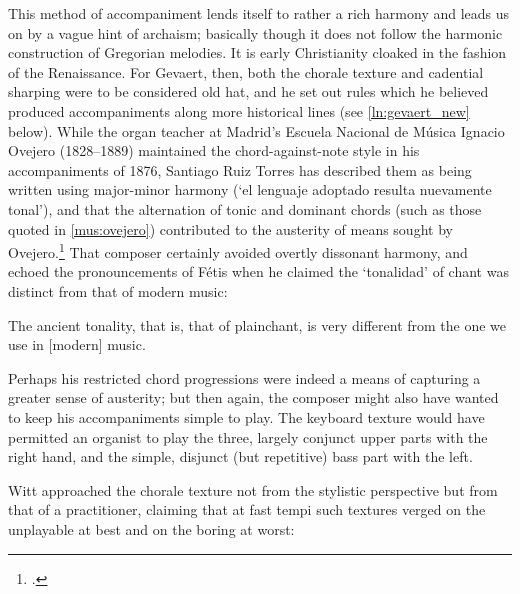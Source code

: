   {\cite[`Preface' p.~4]{GevaertVademecumorganistecontenant1871}}
{This method of accompaniment lends itself to rather a rich harmony and leads us on by a vague hint of archaism; basically though it does not follow the harmonic construction of Gregorian melodies. It is early Christianity cloaked in the fashion of the Renaissance.}
\noindent
For Gevaert, then, both the chorale texture and cadential sharping were to be considered old hat, and he set out rules which he believed produced accompaniments along more historical lines (see \cref{ln:gevaert_new} below).
%
While the organ teacher at Madrid's Escuela Nacional de Música Ignacio Ovejero (1828--1889) maintained the chord-against-note style in his accompaniments of 1876, Santiago Ruiz Torres has described them as being written using major-minor harmony (`el lenguaje adoptado resulta nuevamente tonal'), and that the alternation of tonic and dominant chords (such as those quoted in \cref{mus:ovejero}) contributed to the austerity of means sought by Ovejero.\footcite[993]{Torresfacetadesatendidaquehacer2013}
That composer certainly avoided overtly dissonant harmony, and echoed the pronouncements of Fétis when he claimed the `tonalidad' of chant was distinct from that of modern music:

  {\cite[4, 36]{OvejeroEscuelaorganistatratado1876}}
{The ancient tonality, that is, that of plainchant, is very different from the one we use in [modern] music.}

\noindent
Perhaps his restricted chord progressions were indeed a means of capturing a greater sense of austerity; but then again, the composer might also have wanted to keep his accompaniments simple to play.
The keyboard texture would have permitted an organist to play the three, largely conjunct upper parts with the right hand, and the simple, disjunct (but repetitive) bass part with the left.

Witt approached the chorale texture not from the stylistic perspective but from that of a practitioner, claiming that at fast tempi such textures verged on the unplayable at best and on the boring at worst:

